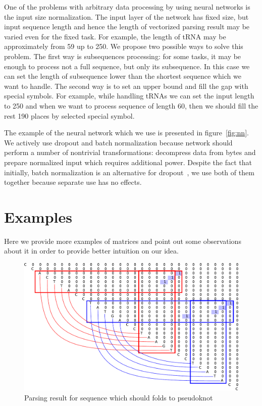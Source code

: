 \documentclass[a4paper,twoside]{article}
\begin{document}
One of the problems with arbitrary data processing by using neural networks is the input size normalization.
The input layer of the network has fixed size, but input sequence length and hence the length of vectorized parsing result may be varied even for the fixed task.
For example, the length of tRNA may be approximately from 59 up to 250.
We propose two possible ways to solve this problem.
The first way is subsequences processing: for some tasks, it may be enough to process not a full sequence, but only its subsequence.
In this case we can set the length of subsequence lower than the shortest sequence which we want to handle. 
The second way is to set an upper bound and fill the gap with special symbols.
For example, while handling tRNAs we can set the input length to 250 and when we want to process sequence of length 60, then we should fill the rest 190 places by selected special symbol.

The example of the neural network which we use is presented in figure~\ref{fig:nn}.
We actively use dropout and batch normalization because network should perform a number of nontrivial transformations: decompress data from bytes and prepare normalized input which requires additional power.
Despite the fact that initially, batch normalization is an alternative for dropout~\cite{DBLP:journals:corr:IoffeS15}, we use both of them together because separate use has no effects.

\section{Examples}
\label{sec:examples}

\noindent Here we provide more examples of matrices and point out some observations about it in order to provide better intuition on our idea.

\begin{figure}
\centering
\includegraphics[width=.45\textwidth]{figures/5.pdf}
\caption{Parsing result for sequence which should folds to pseudoknot}
\label{fig:pseudoknot}
\end{figure}
\end{document}
